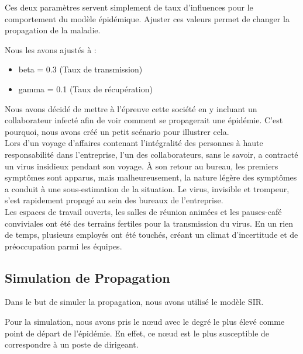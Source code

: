 \documentclass{article}
\begin{document}
Ces deux paramètres servent simplement de taux d'influences pour le comportement du modèle épidémique. Ajuster ces valeurs permet de changer la propagation de la maladie.

Nous les avons ajustés à :
\begin{itemize}
    \item beta = 0.3 (Taux de transmission)
    \item gamma = 0.1 (Taux de récupération)
\end{itemize}


Nous avons décidé de mettre à l'épreuve cette société en y incluant un collaborateur infecté afin de voir comment se propagerait une épidémie. C'est pourquoi, nous avons créé un petit scénario pour illustrer cela. \\

Lors d'un voyage d'affaires contenant l'intégralité des personnes à haute responsabilité dans l'entreprise, l'un des collaborateurs, sans le savoir, a contracté un virus insidieux pendant son voyage. À son retour au bureau, les premiers symptômes sont apparus, mais malheureusement, la nature légère des symptômes a conduit à une sous-estimation de la situation. Le virus, invisible et trompeur, s'est rapidement propagé au sein des bureaux de l'entreprise. \\

Les espaces de travail ouverts, les salles de réunion animées et les pauses-café conviviales ont été des terrains fertiles pour la transmission du virus. En un rien de temps, plusieurs employés ont été touchés, créant un climat d'incertitude et de préoccupation parmi les équipes.

\subsection{Simulation de Propagation}

Dans le but de simuler la propagation, nous avons utilisé le modèle SIR.

Pour la simulation, nous avons pris le nœud avec le degré le plus élevé comme point de départ de l'épidémie. En effet, ce nœud est le plus susceptible de correspondre à un poste de dirigeant. \\
\end{document}
